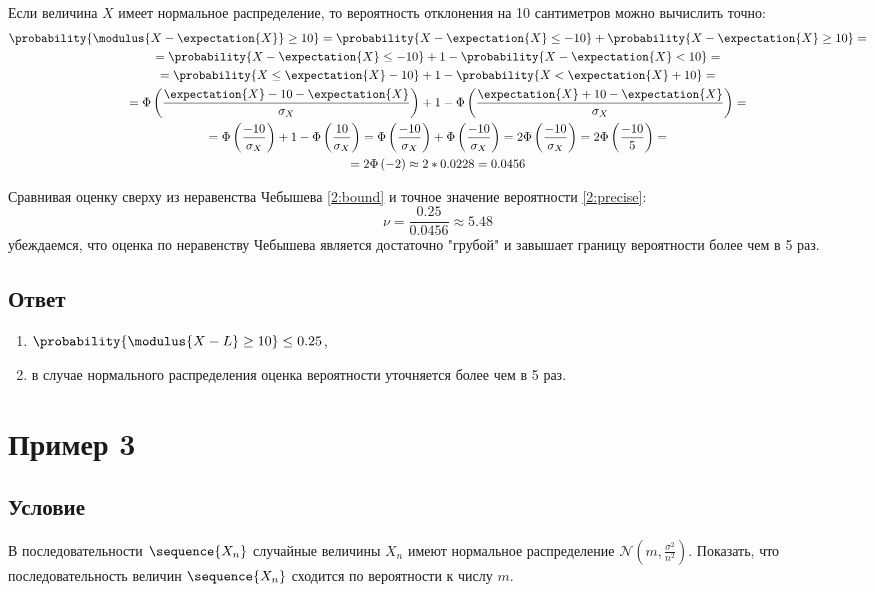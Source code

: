 Если величина $X$ имеет нормальное распределение, то вероятность отклонения на 10 сантиметров можно вычислить точно:
\begin{multline}
    \label{2:precise}
    \probability{\modulus{X - \expectation{X}} \ge 10}
    = \probability{X - \expectation{X} \le - 10} + \probability{ X - \expectation{X} \ge 10} = \\
    = \probability{X - \expectation{X} \le - 10} + 1 - \probability{ X - \expectation{X} < 10} = \\
    = \probability{X \le \expectation{X} - 10} + 1 - \probability{ X < \expectation{X} + 10} = \\
    = \Phi \left ( \frac{\expectation{X} - 10 - \expectation{X}}{\sigma_X} \right ) + 1 - \Phi \left ( \frac{\expectation{X} + 10 - \expectation{X}}{\sigma_X} \right ) = \\
    = \Phi \left ( \frac{- 10}{\sigma_X} \right ) + 1 - \Phi \left ( \frac{10}{\sigma_X} \right )
    = \Phi \left ( \frac{- 10}{\sigma_X} \right ) + \Phi \left ( \frac{- 10}{\sigma_X} \right )
    = 2 \Phi \left ( \frac{- 10}{\sigma_X} \right )
    = 2 \Phi \left ( \frac{- 10}{5} \right ) = \\
    = 2 \Phi \left ( - 2 \right )
    \approx 2 * 0.0228
    = 0.0456
\end{multline}

Сравнивая оценку сверху из неравенства Чебышева \eqref{2:bound} и точное значение вероятности \eqref{2:precise}:
\begin{equation}
    \nu = \frac{0.25}{0.0456} \approx 5.48
\end{equation}
убеждаемся, что оценка по неравенству Чебышева является достаточно "грубой"{} и завышает границу вероятности более чем в 5 раз.
\subsection*{Ответ}
\begin{enumerate}
    \item $ \probability{ \modulus{X - L} \ge 10 } \le 0.25 $,
    \item в случае нормального распределения оценка вероятности уточняется более чем в 5 раз.
\end{enumerate}


\section{Пример 3}
\subsection*{Условие}
В последовательности $\sequence{X_n}$ случайные величины $X_n$ имеют нормальное распределение $\mathcal{N} \left ( m, \frac{\sigma^2}{n^2} \right )$.
Показать, что последовательность величин $\sequence{X_n}$ сходится по вероятности к числу $m$.

